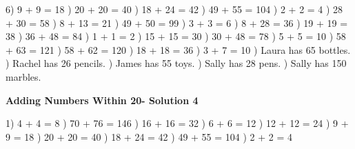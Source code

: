 \documentclass{article}%
\begin{document}
6) 9 + 9 = 18%
) 20 + 20 = 40%
) 18 + 24 = 42%
) 49 + 55 = 104%
) 2 + 2 = 4%
) 28 + 30 = 58%
) 8 + 13 = 21%
) 49 + 50 = 99%
) 3 + 3 = 6%
) 8 + 28 = 36%
) 19 + 19 = 38%
) 36 + 48 = 84%
) 1 + 1 = 2%
) 15 + 15 = 30%
) 30 + 48 = 78%
) 5 + 5 = 10%
) 58 + 63 = 121%
) 58 + 62 = 120%
) 18 + 18 = 36%
) 3 + 7 = 10%
) Laura has 65 bottles.%
) Rachel has 26 pencils.%
) James has 55 toys.%
) Sally has 28 pens.%
) Sally has 150 marbles.%
\newline%
\newpage%
\large%
\begin{center}%
\textbf{Adding Numbers Within 20- Solution 4}%
\newline%
\end{center} \normalsize%
1) 4 + 4 = 8%
) 70 + 76 = 146%
) 16 + 16 = 32%
) 6 + 6 = 12%
) 12 + 12 = 24%
) 9 + 9 = 18%
) 20 + 20 = 40%
) 18 + 24 = 42%
) 49 + 55 = 104%
) 2 + 2 = 4%
\newline%
\end{document}
